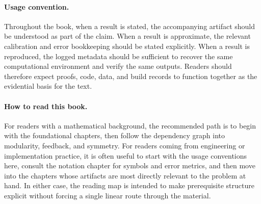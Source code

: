 \documentclass[11pt]{article}
\begin{document}
\paragraph{Usage convention.}
Throughout the book, when a result is stated, the accompanying artifact should be understood as part of the claim. When a result is approximate, the relevant calibration and error bookkeeping should be stated explicitly. When a result is reproduced, the logged metadata should be sufficient to recover the same computational environment and verify the same outputs. Readers should therefore expect proofs, code, data, and build records to function together as the evidential basis for the text.

\paragraph{How to read this book.}
For readers with a mathematical background, the recommended path is to begin with the foundational chapters, then follow the dependency graph into modularity, feedback, and symmetry. For readers coming from engineering or implementation practice, it is often useful to start with the usage conventions here, consult the notation chapter for symbols and error metrics, and then move into the chapters whose artifacts are most directly relevant to the problem at hand. In either case, the reading map is intended to make prerequisite structure explicit without forcing a single linear route through the material.
\end{document}
